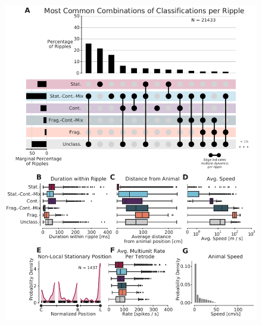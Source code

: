 \documentclass[9pt,lineno]{elife}
\providecommand{\DIFaddbeginFL}{} %
\providecommand{\DIFaddendFL}{} %
\providecommand{\DIFdelbeginFL}{} %
\providecommand{\DIFdelendFL}{} %
\newcommand{\DIFscaledelfig}{0.5}
\newlength{\DIFdelgraphicswidth} %
\newlength{\DIFdelgraphicsheight} %
\newcommand{\DIFaddincludegraphics}[2][]{{\color{blue}\fbox{\DIFOincludegraphics[#1]{#2}}}} %
\newcommand{\DIFdelincludegraphics}[2][]{%
\sbox{\DIFdelgraphicsbox}{\DIFOincludegraphics[#1]{#2}}%
\settoboxwidth{\DIFdelgraphicswidth}{\DIFdelgraphicsbox} %
\settoboxtotalheight{\DIFdelgraphicsheight}{\DIFdelgraphicsbox} %
\scalebox{\DIFscaledelfig}{%
\parbox[b]{\DIFdelgraphicswidth}{\usebox{\DIFdelgraphicsbox}\\[-\baselineskip] \rule{\DIFdelgraphicswidth}{0em}}\llap{\resizebox{\DIFdelgraphicswidth}{\DIFdelgraphicsheight}{%
\setlength{\unitlength}{\DIFdelgraphicswidth}%
\begin{picture}(1,1)%
\thicklines\linethickness{2pt} %
{\color[rgb]{1,0,0}\put(0,0){\framebox(1,1){}}}%
{\color[rgb]{1,0,0}\put(0,0){\line( 1,1){1}}}%
{\color[rgb]{1,0,0}\put(0,1){\line(1,-1){1}}}%
\end{picture}%
}\hspace*{3pt}}} %
} %
\DeclareRobustCommand{\DIFaddbeginFL}{\DIFOaddbeginFL \let\includegraphics\DIFaddincludegraphics} %
\DeclareRobustCommand{\DIFaddendFL}{\DIFOaddendFL \let\includegraphics\DIFOincludegraphics} %
\DeclareRobustCommand{\DIFdelbeginFL}{\DIFOdelbeginFL \let\includegraphics\DIFdelincludegraphics} %
\DeclareRobustCommand{\DIFdelendFL}{\DIFOaddendFL \let\includegraphics\DIFOincludegraphics} %
\begin{document}
\begin{figure}
\DIFdelbeginFL %
\DIFdelendFL \DIFaddbeginFL \includegraphics[width=0.80\linewidth]{figures/Figure5/Figure5_v6}
\DIFaddendFL \caption{
}
\end{figure}
\end{document}
